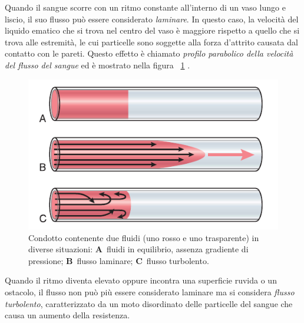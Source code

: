 Quando il sangue scorre con un ritmo constante all'interno di un vaso lungo e liscio, il suo flusso può essere considerato \textit{laminare}. In questo caso, la velocità del liquido ematico che si trova nel centro del vaso è maggiore rispetto a quello che si trova alle estremità, le cui particelle sono soggette alla forza d'attrito causata dal contatto con le pareti. Questo effetto è chiamato \textit{profilo parabolico della velocità del flusso del sangue}\cite{Hall2016} ed è mostrato nella figura \Fig~\ref{fig:FlussoParabolico} .
\begin{figure}[tb]
	\centering
	\includegraphics[width=0.6\linewidth]{ImageFiles/Fotopletismografia/FlussoParabolico}
	\caption{Condotto contenente due fluidi (uno rosso e uno trasparente) in diverse situazioni: \textbf{A}~fluidi in equilibrio, assenza gradiente di pressione; \textbf{B}~flusso laminare; \textbf{C}~flusso turbolento.}
	\label{fig:FlussoParabolico}
\end{figure}
Quando il ritmo diventa elevato oppure incontra una superficie ruvida o un ostacolo, il flusso non può più essere considerato laminare ma si considera \textit{flusso turbolento}, caratterizzato da un moto disordinato delle particelle del sangue che causa un aumento della resistenza.


